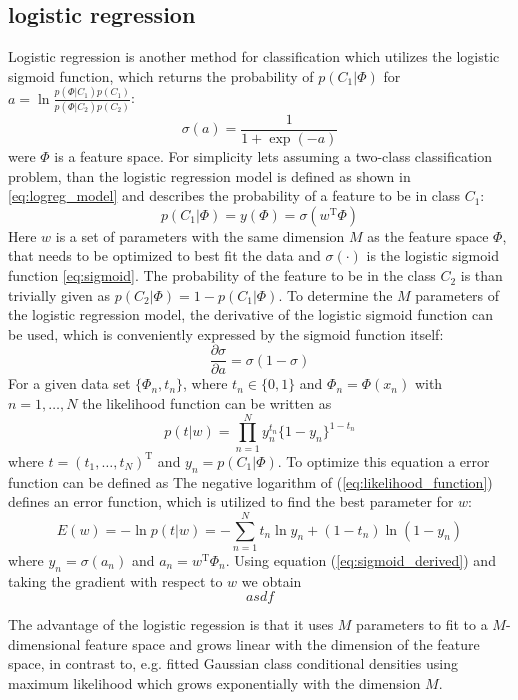 \subsection{logistic regression}
Logistic regression is another method for classification which utilizes the logistic sigmoid function, which returns the probability of $p(C_1|\Phi)$ for $a = \ln\frac{p(\Phi|C_1)p(C_1)}{p(\Phi|C_2)p(C_2)}$:
\begin{equation} \label{eq:sigmoid}
\sigma(a) = \frac{1}{1 + \exp(-a)}
\end{equation}
were $\Phi$ is a feature space. 
For simplicity lets  assuming a two-class classification problem, than the logistic regression model is defined as shown in \ref{eq:logreg_model} and describes the probability of a feature to be in class $C_1$:
\begin{equation} \label{eq:logreg_model}
p(C_1|\Phi) = y(\Phi) = \sigma(w^\text{T}\Phi)
\end{equation}
Here $w$ is a set of parameters with the same dimension $M$ as the feature space $\Phi$, that needs to be optimized to best fit the data and $\sigma(\cdot)$ is the logistic sigmoid function \ref{eq:sigmoid}. The probability of the feature to be in the class $C_2$ is than trivially given as $p(C_2|\Phi) = 1 - p(C_1|\Phi)$. To determine the $M$ parameters of the logistic regression model, the derivative of the logistic sigmoid function can be used, which is conveniently expressed by the sigmoid function itself:
\begin{equation} \label{eq:sigmoid_derived}
\frac{\partial\sigma}{\partial a} = \sigma(1-\sigma)
\end{equation}
For a given data set $\{\Phi_n,t_n\}$, where $t_n \in \{0,1\}$ and $\Phi_n=\Phi(x_n)$ with $n = 1,  \dots, N$ the likelihood function can be written as
\begin{equation} \label{eq:likelihood_function}
p(t|w)=\prod_{n=1}^{N}y_n^{t_n} \{1-y_n\}^{1-t_n}
\end{equation}
where $t=(t_1, \dots, t_N)^\text{T}$ and $y_n=p(C_1|\Phi)$. To optimize this equation a error function can be defined as 
The negative logarithm of (\ref{eq:likelihood_function}) defines an error function, which is utilized to find the best parameter for $w$:
\begin{equation} \label{eq:likelihood_function}
E(w)=-\ln p(t|w) = - \sum_{n=1}^{N}t_n \ln y_n + (1-t_n) \ln (1-y_n)
\end{equation}
where $y_n=\sigma(a_n)$ and $a_n=w^\text{T}\Phi_n$. Using equation (\ref{eq:sigmoid_derived}) and taking the gradient with respect to $w$ we obtain
\begin{equation} \label{eq:likelihood_function}
asdf
\end{equation}



The advantage of the logistic regession is that it uses $M$ parameters to fit to a $M$-dimensional feature space and grows linear with the dimension of the feature space, in contrast to, e.g. fitted Gaussian class conditional densities using maximum likelihood which grows exponentially with the dimension $M$.